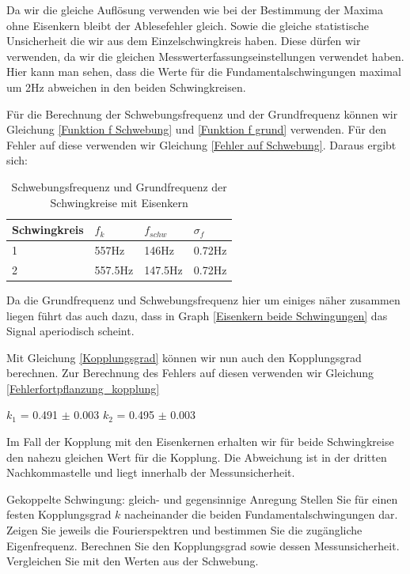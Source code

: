 \documentclass[twoside]{protokoll}
\begin{document}
Da wir die gleiche Auflösung verwenden wie bei der Bestimmung der Maxima ohne Eisenkern bleibt der Ablesefehler gleich. Sowie die gleiche statistische Unsicherheit die wir aus dem Einzelschwingkreis haben. Diese dürfen wir verwenden, da wir die gleichen Messwerterfassungseinstellungen verwendet haben. 
Hier kann man sehen, dass die Werte für die Fundamentalschwingungen maximal um 2Hz abweichen in den beiden Schwingkreisen.

Für die Berechnung der Schwebungsfrequenz und der Grundfrequenz können wir Gleichung \ref{Funktion f Schwebung} und \ref{Funktion f grund} verwenden. 
Für den Fehler auf diese verwenden wir Gleichung \ref{Fehler auf Schwebung}.
Daraus ergibt sich:

\begin{table}[H]
    \centering
    \begin{tabularx}{1\textwidth}{X X X X} %
        \toprule
        \textbf{Schwingkreis} & \textbf{$f_k$} & \textbf{$f_{schw}$} & \textbf{$\sigma_f$} \\
        \midrule
        1 & 557Hz & 146Hz & 0.72Hz\\
        2 & 557.5Hz & 147.5Hz & 0.72Hz \\
        \bottomrule
    \end{tabularx}
    \caption{Schwebungsfrequenz und Grundfrequenz der Schwingkreise mit Eisenkern}
    \label{•}
\end{table} 
Da die Grundfrequenz und Schwebungsfrequenz hier um einiges näher zusammen liegen führt das auch dazu, dass in Graph \ref{Eisenkern beide Schwingungen} das Signal aperiodisch scheint.

Mit Gleichung \ref{Kopplungsgrad} können wir nun auch den Kopplungsgrad berechnen. Zur Berechnung des Fehlers auf diesen verwenden wir Gleichung \ref{Fehlerfortpflanzung_kopplung}

\begin{center}
$k_1$ = 0.491 $\pm$ 0.003 \qquad $k_2$ = 0.495 $\pm$ 0.003
\end{center}

Im Fall der Kopplung mit den Eisenkernen erhalten wir für beide Schwingkreise den nahezu gleichen Wert für die Kopplung.
Die Abweichung ist in der dritten Nachkommastelle und liegt innerhalb der Messunsicherheit.

\begin{aufgabe}{Gekoppelte Schwingung: gleich- und gegensinnige Anregung}
  Stellen Sie für einen festen Kopplungsgrad $k$ nacheinander die
  beiden Fundamentalschwingungen dar. Zeigen Sie jeweils die
  Fourierspektren und bestimmen Sie die zugängliche
  Eigenfrequenz. Berechnen Sie den Kopplungsgrad sowie dessen
  Messunsicherheit. Vergleichen Sie mit den Werten aus der Schwebung.
\end{aufgabe}
\end{document}
